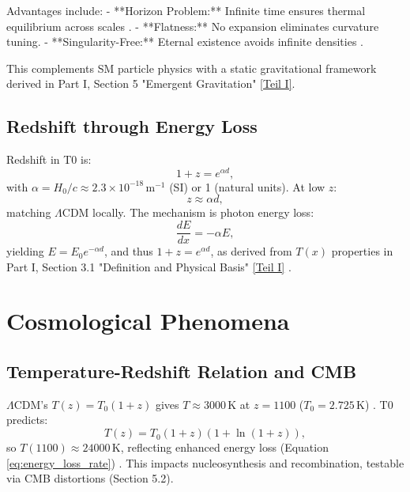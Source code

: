 \documentclass[12pt,a4paper]{article}
\newcommand{\Tfield}{T(x)}
\begin{document}
	Advantages include:
	- **Horizon Problem:** Infinite time ensures thermal equilibrium across scales \cite{pascher_messdifferenzen_2025}.
	- **Flatness:** No expansion eliminates curvature tuning.
	- **Singularity-Free:** Eternal existence avoids infinite densities \cite{pascher_perspective_2025}.
	
	This complements SM particle physics with a static gravitational framework derived in Part I, Section 5 "Emergent Gravitation" \href{https://github.com/jpascher/T0-Time-Mass-Duality/tree/main/2/pdf/English/QMRelTimeMassPart1En.pdf}{[Teil I]}.
	
	\subsection{Redshift through Energy Loss}
	\label{subsec:redshift_energy_loss}
	
	Redshift in T0 is:
	\begin{equation}
		1 + z = e^{\alpha d},
		\label{eq:redshift_distance}
	\end{equation}
	with \(\alpha = H_0 / c \approx 2.3 \times 10^{-18} \, \text{m}^{-1}\) (SI) or 1 (natural units). At low \(z\):
	\begin{equation}
		z \approx \alpha d,
		\label{eq:hubble_approx}
	\end{equation}
	matching \(\Lambda\)CDM locally. The mechanism is photon energy loss:
	\begin{equation}
		\frac{dE}{dx} = -\alpha E,
		\label{eq:energy_loss_rate}
	\end{equation}
	yielding \(E = E_0 e^{-\alpha d}\), and thus \(1 + z = e^{\alpha d}\), as derived from \(\Tfield\) properties in Part I, Section 3.1 "Definition and Physical Basis" \href{https://github.com/jpascher/T0-Time-Mass-Duality/tree/main/2/pdf/English/QMRelTimeMassPart1En.pdf}{[Teil I]} \cite{pascher_messdifferenzen_2025}.
	
	\section{Cosmological Phenomena}
	\label{sec:cosmological_phenomena}
	
	\subsection{Temperature-Redshift Relation and CMB}
	\label{subsec:cmb_temp}
	
	\(\Lambda\)CDM’s \(T(z) = T_0 (1 + z)\) gives \(T \approx 3000 \, \text{K}\) at \(z = 1100\) (\(T_0 = 2.725 \, \text{K}\)) \cite{Fixsen2009}. T0 predicts:
	\begin{equation}
		T(z) = T_0 (1 + z) (1 + \ln(1 + z)),
		\label{eq:temperature_redshift_simplified}
	\end{equation}
	so \(T(1100) \approx 24000 \, \text{K}\), reflecting enhanced energy loss (Equation \ref{eq:energy_loss_rate}) \cite{pascher_temp_2025}. This impacts nucleosynthesis and recombination, testable via CMB distortions (Section 5.2).
	
\end{document}

